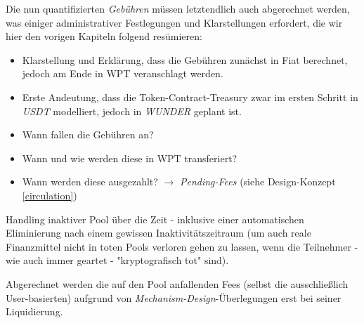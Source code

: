 Die nun quantifizierten \textit{Gebühren} müssen letztendlich auch abgerechnet werden, was einiger administrativer Festlegungen und Klarstellungen erfordert, die wir hier den vorigen Kapiteln folgend resümieren:

\vspace{0.2cm}

\begin{Praemisse}
\vspace{0.2cm}


\begin{itemize}
	\item Klarstellung und Erklärung, dass die Gebühren zunächst in Fiat berechnet, jedoch am Ende in WPT veranschlagt werden.
	\item Erste Andeutung, dass die Token-Contract-Treasury zwar im ersten Schritt in \textit{USDT} modelliert, jedoch in \textit{WUNDER} geplant ist.
\end{itemize}

\end{Praemisse}

\vspace{0.5cm}


\begin{Praemisse}
\vspace{0.2cm}


\begin{itemize}
	\item Wann fallen die Gebühren an? 
	\item Wann und wie werden diese in WPT transferiert? 
	\item Wann werden diese ausgezahlt? $\rightarrow$ \textit{Pending-Fees} (siehe Design-Konzept \ref{circulation})
\end{itemize}

\end{Praemisse}



Handling inaktiver Pool über die Zeit - inklusive einer automatischen Eliminierung nach einem gewissen Inaktivitätszeitraum (um auch reale Finanzmittel nicht in toten Pools verloren gehen zu lassen, wenn die Teilnehmer - wie auch immer geartet - "kryptografisch tot" sind).

\vspace{0.5cm}

Abgerechnet werden die auf den Pool anfallenden Fees (selbst die ausschließlich User-basierten) aufgrund von \textit{Mechanism-Design}-Überlegungen erst bei seiner Liquidierung.

